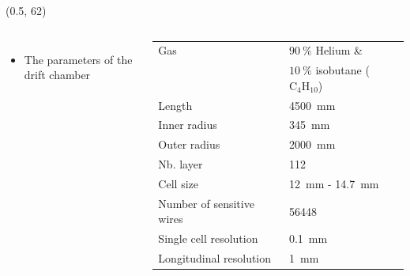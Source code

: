 \documentclass[final,xcolor={dvipsnames,svgnames,x11names,table}]{beamer}
\begin{document}
\begin{frame}
\begin{textblock}{39}
\begin{tcolorbox}[title=The IDEA detector as simulated with FCCSW]



  \end{tcolorbox}
\end{textblock}

\begin{textblock}{40}(0.5, 62)
  \begin{tcolorbox}[title=The parameters of the drift chamber]

  \begin{columns}

      \begin{itemize}
        \item The parameters of the drift chamber
      \end{itemize}

      \begin{tabular}{l l}
        \toprule
          Gas & $90~\%$ Helium \&\\
          & $10~\%$ isobutane ($\text{C}_{4}\text{H}_{10}$) \\
          Length & 4500~mm \\
          Inner radius & 345~mm \\
          Outer radius & 2000~mm\\
          Nb. layer & 112 \\
          Cell size & 12~mm - 14.7~mm \\
          Number of sensitive wires & 56448 \\
          Single cell resolution & 0.1~mm \\
          Longitudinal resolution & 1~mm \\
        \bottomrule
      \end{tabular}


\end{columns}
\end{tcolorbox}
\end{textblock}
\end{frame}
\end{document}

